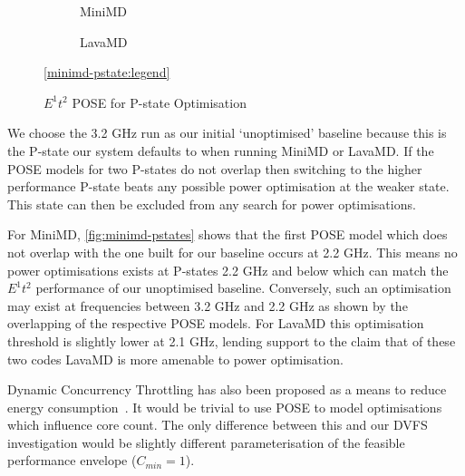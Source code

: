 \begin{figure*}[t]%
\begin{subfigure}[t]{.5\linewidth}%
\centering%
%
\caption{MiniMD}%
\label{fig:minimd-pstates}%
\end{subfigure}%
\begin{subfigure}[t]{.5\linewidth}%
%
\caption{LavaMD}%
\label{fig:lavamd-pstates}%
\end{subfigure}%
\begin{center}%
\ref{minimd-pstate:legend}%
\end{center}%
\caption{$E^1t^2$ POSE for P-state Optimisation}%
\label{fig:pstates}%
\end{figure*}%

We choose the 3.2 GHz run as our initial `unoptimised' baseline because this is the P-state our system defaults to when running MiniMD or LavaMD.
If the POSE models for two P-states do not overlap then switching to the higher performance P-state beats any possible power optimisation at the weaker state.
This state can then be excluded from any search for power optimisations.

For MiniMD, \autoref{fig:minimd-pstates} shows that the first POSE model which does not overlap with the one built for our baseline occurs at 2.2 GHz.
This means no power optimisations exists at P-states 2.2 GHz and below which can match the $E^1t^2$ performance of our unoptimised baseline.
Conversely, such an optimisation may exist at frequencies between 3.2 GHz and 2.2 GHz as shown by the overlapping of the respective POSE models.
For LavaMD this optimisation threshold is slightly lower at 2.1 GHz, lending support to the claim that of these two codes LavaMD is more amenable to power optimisation.

Dynamic Concurrency Throttling has also been proposed as a means to reduce energy consumption~\cite{maury:2006aa}.
It would be trivial to use POSE to model optimisations which influence core count.
The only difference between this and our DVFS investigation would be slightly different parameterisation of the feasible performance envelope ($C_{min}=1$).
